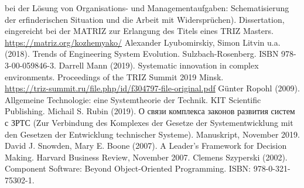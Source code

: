 \documentclass[12pt,a4paper]{article}
\begin{document}
\begin{thebibliography}{xxx}
  bei der Lösung von Organisations- und Managementaufgaben: Schematisierung
  der erfinderischen Situation und die Arbeit mit Widersprüchen).
  Dissertation, eingereicht bei der MATRIZ zur Erlangung des Titels eines TRIZ
  Masters.\\  \url{https://matriz.org/kozhemyako/}
 Alexander Lyubomirskiy, Simon Litvin u.a.  (2018). Trends
  of Engineering System Evolution. Sulzbach-Rosenberg.  ISBN
  978-3-00-059846-3.
 Darrell Mann (2019).  Systematic innovation in complex
  environments. Proceedings of the TRIZ Summit 2019
  Minsk.\\ \url{https://triz-summit.ru/file.php/id/f304797-file-original.pdf}
 Günter Ropohl (2009). Allgemeine Technologie: eine
  Systemtheorie der Technik.  KIT Scientific Publishing.
 Michail S. Rubin (2019).  \foreignlanguage{russian}{О
  связи комплекса законов развития систем с ЗРТС} (Zur Verbindung des
  Komplexes der Gesetze der Systementwicklung mit den Gesetzen der Entwicklung
  technischer Systeme). Manuskript, November 2019.
 David J. Snowden, Mary E. Boone (2007).  A Leader’s
  Framework for Decision Making.  Harvard Business Review, November 2007.
 Clemens Szyperski (2002). Component Software: Beyond
  Object-Oriented Programming. ISBN: 978-0-321-75302-1.
\end{thebibliography}
\end{document}
